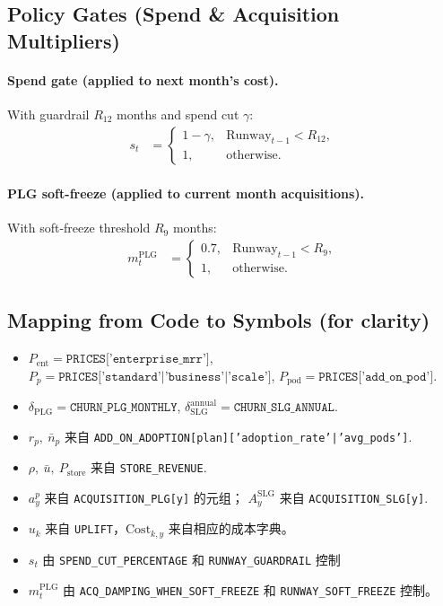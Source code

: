\documentclass[11pt, a4paper, oneside]{article}
\begin{document}
\subsection{Policy Gates (Spend \& Acquisition Multipliers)}
\paragraph{Spend gate (applied to next month’s cost).}
With guardrail $R_{12}$ months and spend cut $\gamma$:
\begin{align}
s_t 
  &= 
  \begin{cases}
    1-\gamma, & \mathrm{Runway}_{t-1} < R_{12},\\
    1, & \text{otherwise.}
  \end{cases}
\end{align}

\paragraph{PLG soft-freeze (applied to current month acquisitions).}
With soft-freeze threshold $R_{9}$ months:
\begin{align}
m^{\mathrm{PLG}}_t 
  &= 
  \begin{cases}
    0.7, & \mathrm{Runway}_{t-1} < R_{9},\\
    1, & \text{otherwise.}
  \end{cases}
\end{align}

\subsection{Mapping from Code to Symbols (for clarity)}
\begin{itemize}
  \item $P_{\mathrm{ent}} = \texttt{PRICES['enterprise\_mrr']}$, $P_p=\texttt{PRICES['standard'|'business'|'scale']}$, $P_{\mathrm{pod}}=\texttt{PRICES['add\_on\_pod']}$.
  \item $\delta_{\mathrm{PLG}}=\texttt{CHURN\_PLG\_MONTHLY}$, $\delta^{\mathrm{annual}}_{\mathrm{SLG}}=\texttt{CHURN\_SLG\_ANNUAL}$.
  \item $r_p,\ \bar{n}_p$ 来自 \texttt{ADD\_ON\_ADOPTION[plan]['adoption\_rate'|'avg\_pods']}.
  \item $\rho,\ \bar{u},\ P_{\mathrm{store}}$ 来自 \texttt{STORE\_REVENUE}.
  \item $a^p_y$ 来自 \texttt{ACQUISITION\_PLG[y]} 的元组； $A^{\mathrm{SLG}}_y$ 来自 \texttt{ACQUISITION\_SLG[y]}.
  \item $u_k$ 来自 \texttt{UPLIFT}，$\mathrm{Cost}_{k,y}$ 来自相应的成本字典。
  \item $s_t$ 由 \texttt{SPEND\_CUT\_PERCENTAGE} 和 \texttt{RUNWAY\_GUARDRAIL} 控制
  \item $m^{\mathrm{PLG}}_t$ 由 \texttt{ACQ\_DAMPING\_WHEN\_SOFT\_FREEZE} 和 \texttt{RUNWAY\_SOFT\_FREEZE} 控制。
\end{itemize}
\end{document}
